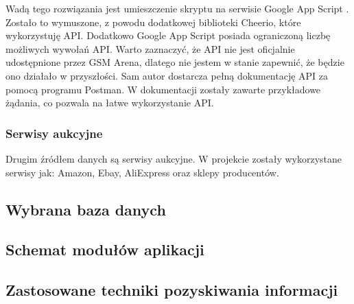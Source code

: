 Wadą tego rozwiązania jest umieszczenie skryptu na serwisie Google App Script \cite{google_app_script}. Zostało to wymuszone, z powodu dodatkowej biblioteki Cheerio, które wykorzystuję API. Dodatkowo Google App Script posiada ograniczoną liczbę możliwych wywołań API. Warto zaznaczyć, że API nie jest oficjalnie udostępnione przez GSM Arena, dlatego nie jestem w stanie zapewnić, że będzie ono działało w przyszłości. Sam autor dostarcza pełną dokumentację API za pomocą programu Postman. W dokumentacji \cite{gsm_arena_api_reference} zostały zawarte przykładowe żądania, co pozwala na łatwe wykorzystanie API.

\subsubsection{Serwisy aukcyjne}
Drugim źródłem danych są serwisy aukcyjne. W projekcie zostały wykorzystane serwisy jak: Amazon, Ebay, AliExpress oraz sklepy producentów. 

\subsection{Wybrana baza danych}

\subsection{Schemat modułów aplikacji}

\subsection{Zastosowane techniki pozyskiwania informacji}
